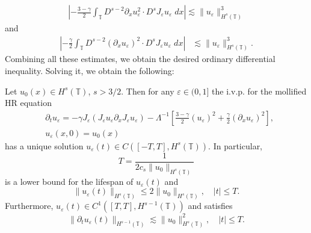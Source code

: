 \documentclass{beamer}
\newcommand{\p}{\partial}
\newcommand{\ci}{\mathbb{T}}
\newcommand{\ee}{\varepsilon}
\begin{document}
\begin{frame}


\begin{equation*}
\label{hl1}
\begin{split}
\left | - \frac{3 -\gamma}{2} \int_\ci D^{s-2} \p_x u_\ee^2 \cdot
D^s J_\ee u_\ee \; dx \right |
\lesssim \| u_\ee \|^3_{H^s(\ci)}
\end{split}
\end{equation*}
%
%
%
%
%
%
and 
%
%
\begin{equation*}
\label{hl2}
\begin{split}
\left | - \frac{\gamma}{2} \int_\ci D^{s-2} (\p_x u_\ee)^2 \cdot
D^s J_\ee u_\ee \; dx \right |
& \lesssim \|u_\ee\|_{H^s(\ci)}^3.
\end{split}
\end{equation*}
%
%
%
Combining all these estimates, we obtain
the desired ordinary differential inequality. Solving  
it, we obtain the following:

%
%
\end{frame}
%
%
%
\begin{frame}
%
%
\begin{lemma}
\label{hr_wp}
Let  $u_0(x) \in  H^s(\ci)$, $s >3/2$. Then for any $\ee\in (0, 1]$
the i.v.p. for the mollified HR equation 
%
%
%
\begin{align*} 
& \partial_t  u_\ee =
-\gamma J_\ee (J_\ee u_\ee \partial_x  J_\ee  u_\ee) - \Lambda^{-1} \left
[\frac{3-\gamma}{2}(u_\ee)^2 + \frac{\gamma}{2}(\p_x u_\ee)^2
\right ], 
\\
&  u_\ee(x, 0) = u_0 (x)
\label{burgers-moli-data-2}
\end{align*}
%
% 
%
%
%
%
%
%
has a unique solution $u_\ee( t)\in C([-T, T], H^s(\ci))$.  In particular,
%
%
%
\begin{equation*} \label{life-est}
T
=
\frac{1}{ 2 c_s \|u_0\|_{H^s(\ci)}}
\end{equation*}
%
%
%
is a lower bound for the lifespan of $u_\ee( t)$ and
%
%
%
\begin{equation*}
\label{u-e-Hs-bound}
\|u_\ee(t)\|_{H^s(\ci)}
\le
2 \|u_0 \|_{H^s(\ci)},
\quad
|t| \le T.
\end{equation*}
%
%
%
Furthermore,  $u_\ee( t)\in C^1([T, T], H^{s-1}(\ci))$ and satisfies
%
%
\begin{equation*}
\label{dt-u-e-Hs-bound}
\|\p_t u_\ee(t)\|_{H^{s-1}(\ci)}
\lesssim
\|u_0 \|_{H^s(\ci)}^2,
\quad
|t| \le T.
\end{equation*}
%
%
% 
\end{lemma}
%
%
\end{frame}
\end{document}
